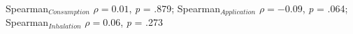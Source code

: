 Spearman$_{Consumption}$ $\rho = 0.01$, \textit{p} = .879; Spearman$_{Application}$ $\rho = -0.09$, \textit{p} = .064; Spearman$_{Inhalation}$ $\rho = 0.06$, \textit{p} = .273%
